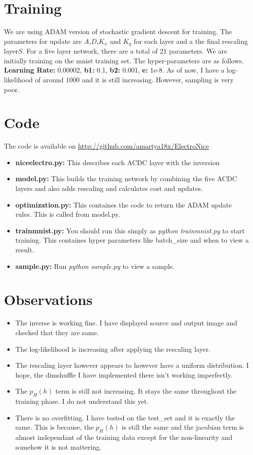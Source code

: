 \documentclass{article}
\begin{document}
\section{Training}
We are using ADAM version of stochastic gradient descent for training. The parameters for update are $A$,$D$,$K_x$ and $K_y$ for each layer and a the final rescaling layer$S$. For a five layer network, there are a total of 21 parameters. We are initially training on the mnist training set. The hyper-parameters are as follows.
\textbf{Learning Rate: }0.00002, \textbf{b1: }0.1, \textbf{b2: }0.001, \textbf{e: }1e-8.
As of now, I have a log-likelihood of around 1000 and it is still increasing. However, sampling is very poor.
\section{Code}
The code is available on \url{http://github.com/amartya18x/ElectroNice}
\begin{itemize}
\item  \textbf{niceelectro.py:} This describes each ACDC layer with the inversion
\item \textbf{model.py:} This builds the training network by combining the five ACDC layers and also adds rescaling and calculates cost and updates.
\item \textbf{optimization.py:} This containes the code to return the ADAM update rules. This is called from model.py.
\item \textbf{trainmnist.py:} You should run this simply as \textit{python trainmnist.py} to start training. This containes hyper parameters like batch\_size and when to view a result.
\item \textbf{sample.py:} Run \textit{python sample.py} to view a sample.
\end{itemize}
\section{Observations}
\begin{itemize}
\item The inverse is working fine. I have displayed source and output image and checked that they are same.
\item The log-likelihood is increasing after applying the rescaling layer.
\item The rescaling layer however appears to however have a uniform distribution. I hope, the dimshuffle I have implemented there isn't working imperfectly.
\item The $p_H(h)$ term is still not increasing. It stays the same throughout the training phase. I do not understand this yet.
\item There is no overfitting. I have tested on the test\_set and it is exactly the same. This is because, the $p_H(h)$ is still the same and the jacobian term is almost independant of the training data except for the non-linearity and somehow it is not mattering.
\end{itemize}
\end{document}
